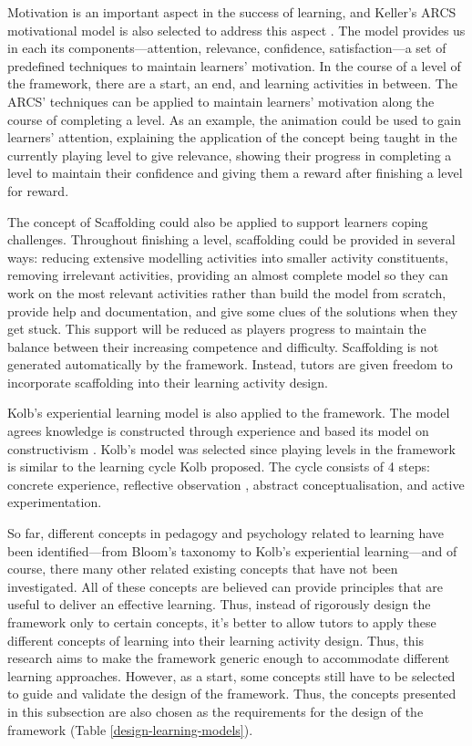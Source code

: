 \documentclass[12pt, a4paper]{report} \usepackage[titletoc]{appendix}
\begin{document}
Motivation is an important aspect in the success of learning, and Keller's ARCS motivational model is also selected to address this aspect \cite{keller2010motivational}. The model provides us in each its components---attention, relevance, confidence, satisfaction---a set of predefined techniques to maintain learners' motivation. In the course of a level of the framework, there are a start, an end, and learning activities in between. The ARCS' techniques can be applied to maintain learners' motivation along the course of completing a level. As an example, the animation could be used to gain learners' attention, explaining the application of the concept being taught in the currently playing level to give relevance, showing their progress in completing a level to maintain their confidence and giving them a reward after finishing a level for reward. 
 
The concept of Scaffolding \cite{vygotsky1978mind, wood1976role} could also be applied to support learners coping challenges. Throughout finishing a level, scaffolding could be provided in several ways: reducing extensive modelling activities into smaller activity constituents, removing irrelevant activities, providing an almost complete model so they can work on the most relevant activities rather than build the model from scratch, provide help and documentation, and give some clues of the solutions when they get stuck. This support will be reduced as players progress to maintain the balance between their increasing competence and difficulty. Scaffolding is not generated automatically by the framework. Instead, tutors are given freedom to incorporate scaffolding into their learning activity design. 

Kolb's experiential learning model \cite{kolb2014experiential} is also applied to the framework. The model agrees knowledge is constructed through experience and based its model on constructivism \cite{kolb2014experiential}. Kolb's model was selected since playing levels in the framework is similar to the learning cycle Kolb proposed. The cycle consists of 4 steps: concrete experience, reflective observation , abstract conceptualisation, and active experimentation. 

So far, different concepts in pedagogy and psychology related to learning have been identified---from Bloom's taxonomy to Kolb's experiential learning---and of course, there many other related existing concepts that have not been investigated. All of these concepts are believed can provide principles that are useful to deliver an effective learning. Thus, instead of rigorously design the framework only to certain concepts, it's better to allow tutors to apply these different concepts of learning into their learning activity design. Thus, this research aims to make the framework generic enough to accommodate different learning approaches. However, as a start, some concepts still have to be selected to guide and validate the design of the framework. Thus, the concepts presented in this subsection are also chosen as the requirements for the design of the framework (Table \ref{design-learning-models}).
\end{document}
